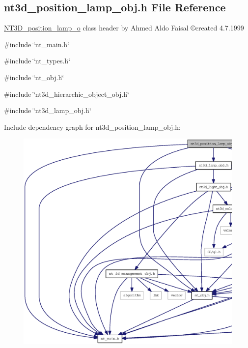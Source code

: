 \subsection{nt3d\_\-position\_\-lamp\_\-obj.h File Reference}
\label{nt3d__position__lamp__obj_8h}



\begin{DoxyItemize}
\item \hyperlink{class_n_t3_d__position__lamp__o}{NT3D\_\-position\_\-lamp\_\-o} class header by Ahmed Aldo Faisal \copyright created 4.7.1999 
\end{DoxyItemize} 


{\ttfamily \#include \char`\"{}nt\_\-main.h\char`\"{}}\par
{\ttfamily \#include \char`\"{}nt\_\-types.h\char`\"{}}\par
{\ttfamily \#include \char`\"{}nt\_\-obj.h\char`\"{}}\par
{\ttfamily \#include \char`\"{}nt3d\_\-hierarchic\_\-object\_\-obj.h\char`\"{}}\par
{\ttfamily \#include \char`\"{}nt3d\_\-lamp\_\-obj.h\char`\"{}}\par
Include dependency graph for nt3d\_\-position\_\-lamp\_\-obj.h:
\nopagebreak
\begin{figure}[H]
\begin{center}
\leavevmode
\includegraphics[width=400pt]{nt3d__position__lamp__obj_8h__incl}
\end{center}
\end{figure}
